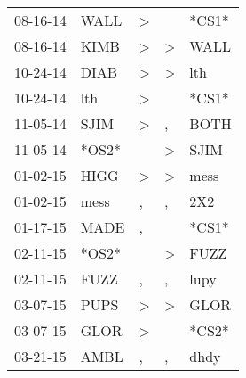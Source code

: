 \begin{supertabular}{p{0.07\textwidth}p{0.06\textwidth}p{0.02\textwidth}p{0.02\textwidth}p{0.06\textwidth}}
          08-16-14\textsuperscript{} &           WALL\textsuperscript{} &     \textgreater &                  &                            *CS1* \\
          08-16-14\textsuperscript{} &           KIMB\textsuperscript{} &     \textgreater &     \textgreater &           WALL\textsuperscript{} \\
          10-24-14\textsuperscript{} &           DIAB\textsuperscript{} &     \textgreater &     \textgreater &            lth\textsuperscript{} \\
          10-24-14\textsuperscript{} &            lth\textsuperscript{} &     \textgreater &                  &                            *CS1* \\
          11-05-14\textsuperscript{} &           SJIM\textsuperscript{} &     \textgreater &                , &           BOTH\textsuperscript{} \\
          11-05-14\textsuperscript{} &                            *OS2* &                  &     \textgreater &           SJIM\textsuperscript{} \\
          01-02-15\textsuperscript{} &           HIGG\textsuperscript{} &     \textgreater &     \textgreater &           mess\textsuperscript{} \\
          01-02-15\textsuperscript{} &           mess\textsuperscript{} &                , &                , &            2X2\textsuperscript{} \\
          01-17-15\textsuperscript{} &           MADE\textsuperscript{} &                , &                  &                            *CS1* \\
          02-11-15\textsuperscript{} &                            *OS2* &                  &     \textgreater &           FUZZ\textsuperscript{} \\
          02-11-15\textsuperscript{} &           FUZZ\textsuperscript{} &                , &                , &           lupy\textsuperscript{} \\
          03-07-15\textsuperscript{} &           PUPS\textsuperscript{} &     \textgreater &     \textgreater &           GLOR\textsuperscript{} \\
          03-07-15\textsuperscript{} &           GLOR\textsuperscript{} &     \textgreater &                  &                            *CS2* \\
          03-21-15\textsuperscript{} &           AMBL\textsuperscript{} &                , &                , &           dhdy\textsuperscript{} \\

\end{supertabular}
